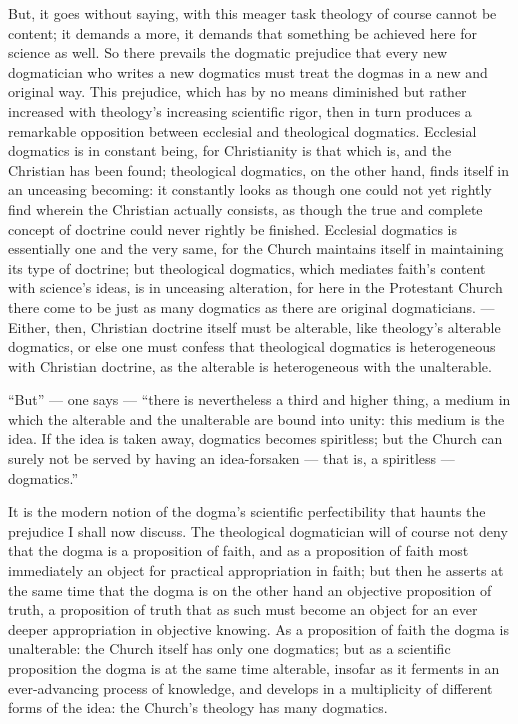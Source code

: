 \documentclass[12pt,a4paper]{book}
\begin{document}
But, it goes without saying, with this meager task theology of course cannot be content; it
demands a more, it demands that something be achieved here for science as well. So there prevails
the dogmatic prejudice that every new dogmatician who writes a new dogmatics must treat the
dogmas in a new and original way. This prejudice, which has by no means diminished but rather
increased with theology's increasing scientific rigor, then in turn produces a remarkable
opposition between ecclesial and theological dogmatics. Ecclesial dogmatics is in constant being,
for Christianity is that which is, and the Christian has been found; theological dogmatics, on
the other hand, finds itself in an unceasing becoming: it constantly looks as though one could
not yet rightly find wherein the Christian actually consists, as though the true and complete
concept of doctrine could never rightly be finished. Ecclesial dogmatics is essentially one and
the very same, for the Church maintains itself in maintaining its type of doctrine; but
theological dogmatics, which mediates faith's content with science's ideas, is in unceasing
alteration, for here in the Protestant Church there come to be just as many dogmatics as there
are original dogmaticians. --- Either, then, Christian doctrine itself must be alterable, like
theology's alterable dogmatics, or else one must confess that theological dogmatics is
heterogeneous with Christian doctrine, as the alterable is heterogeneous with the unalterable.

``But'' --- one says --- ``there is nevertheless a third and higher thing, a medium in which the
alterable and the unalterable are bound into unity: this medium is the idea. If the idea is taken
away,
dogmatics becomes spiritless; but the Church can surely not be served by having an
idea-forsaken --- that is, a spiritless --- dogmatics.''

It is the modern notion of the dogma's scientific perfectibility that haunts the prejudice I
shall now discuss. The theological dogmatician will of course not deny that the dogma is a
proposition of faith, and as a proposition of faith most immediately an object for practical
appropriation in faith; but then he asserts at the same time that the dogma is on the other hand
an objective proposition of truth, a proposition of truth that as such must become an object for
an ever deeper appropriation in objective knowing. As a proposition of faith the dogma is
unalterable: the Church itself has only one dogmatics; but as a scientific proposition the dogma
is at the same time alterable, insofar as it ferments in an ever-advancing process of knowledge,
and develops in a multiplicity of different forms of the idea: the Church's theology has many
dogmatics.
\end{document}
